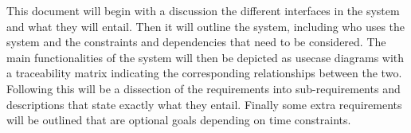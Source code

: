 This document will begin with a discussion the different interfaces in the system and what they will entail. 
        Then it will outline the system, including who uses the system and the constraints and dependencies that need to be considered.
         The main functionalities of the system will then be depicted as usecase diagrams with a traceability matrix indicating 
         the corresponding relationships between the two. Following this will be a dissection of the requirements into 
         sub-requirements and descriptions that state exactly what they entail. Finally some extra requirements will
          be outlined that are optional goals depending on time constraints.